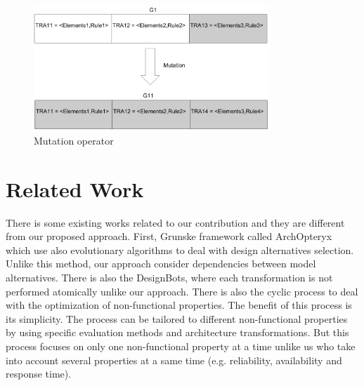 \documentclass[conference]{IEEEtran}
\begin{document}


\begin{figure}[!t]
\centering
\includegraphics[width=3.49in]{mutation.pdf}
\caption{Mutation operator}
\label{mutation}
\end{figure}




\section{Related Work}
\label{Related}
There is some existing works related to our contribution and they are different from our proposed approach. First, Grunske\cite{Gr5069138} framework called ArchOpteryx which use also evolutionary algorithms to deal with design alternatives selection. Unlike this method, our approach consider dependencies between model alternatives. There is also the DesignBots\cite{Diaz-Pace:2007:UPT:1784860.1784865}, where each transformation is not performed atomically unlike our approach. There is also the cyclic process\cite{Bosch99softwarearchitecture} to deal with the optimization of non-functional properties. The benefit of this process is its simplicity. The process can be tailored to different non-functional properties by using specific evaluation methods and architecture transformations. But this process focuses on only one non-functional property at a time unlike us who take into account several properties at a same time (e.g. reliability, availability and response time).
\end{document}

